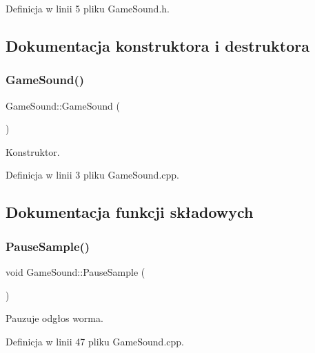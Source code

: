 Definicja w linii 5 pliku Game\+Sound.\+h.



\subsection{Dokumentacja konstruktora i destruktora}
\mbox{\label{class_game_sound_a14feacd320c8a89e68cacf456920c8c1}} 
\subsubsection{\texorpdfstring{Game\+Sound()}{GameSound()}}
{\footnotesize\ttfamily Game\+Sound\+::\+Game\+Sound (\begin{DoxyParamCaption}{ }\end{DoxyParamCaption})}



Konstruktor. 



Definicja w linii 3 pliku Game\+Sound.\+cpp.



\subsection{Dokumentacja funkcji składowych}
\mbox{\label{class_game_sound_a9b64e35e47dd7f06876be460c9cbf67f}} 
\subsubsection{\texorpdfstring{Pause\+Sample()}{PauseSample()}}
{\footnotesize\ttfamily void Game\+Sound\+::\+Pause\+Sample (\begin{DoxyParamCaption}{ }\end{DoxyParamCaption})}



Pauzuje odgłos worma. 



Definicja w linii 47 pliku Game\+Sound.\+cpp.

\mbox{\label{class_game_sound_acd0ef105f4731da50afe47b3e02558a2}} 

